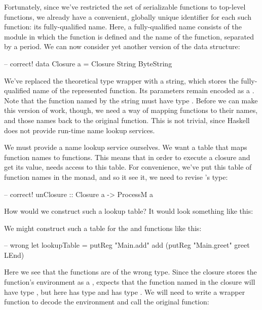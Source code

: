 \documentclass[preprint]{sigplanconf}
\begin{document}
Fortunately, since we've restricted the set of serializable functions to top-level functions, we already have a convenient, globally unique identifier for each such function: its fully-qualified name. Here, a fully-qualified name consists of the module in which the function is defined and the name of the function, separated by a period. We can now consider yet another version of the  data structure:

\begin{code}
-- correct!
data Closure a = Closure String ByteString
\end{code}

We've replaced the theoretical  type wrapper with a string, which stores the fully-qualified name of the represented function. Its parameters remain encoded as a . Note that the function named by the string must have type . Before we can make this version of  work, though, we need a way of mapping functions to their names, and those names back to the original function. This is not trivial, since Haskell does not provide run-time name lookup services.

We must provide a name lookup service ourselves. We want a table that maps function names to functions. This means that in order to execute a closure and get its value,  needs access to this table. For convenience, we've put this table of function names in the  monad, and so it see it, we need to revise 's type:

\begin{code}
-- correct!
unClosure :: Closure a -> ProcessM a
\end{code}

How would we construct such a lookup table? It would look something like this:

We might construct such a table for the  and  functions like this:

\begin{code}
-- wrong
let lookupTable =
  putReg "Main.add" add
    (putReg "Main.greet" greet LEnd)
\end{code}

Here we see that the functions are of the wrong type. Since the closure stores the function's environment as a ,  expects that the function named in the closure will have type , but here  has type  and  has type . We will need to write a wrapper function to decode the environment and call the original function:
\end{document}
